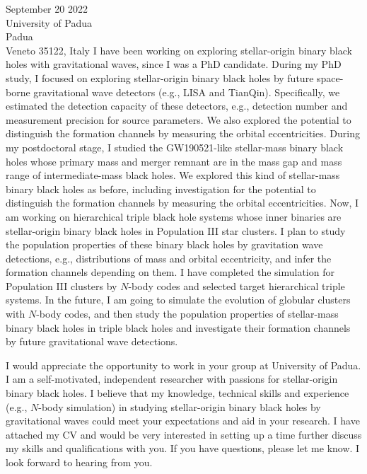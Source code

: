 \documentclass[11pt,a4paper,sans]{letter} %
\begin{document}
\begin{letter}{September 20 2022 \\
University of Padua\\
Padua\\ 
Veneto 35122, Italy}
I have been working on exploring stellar-origin binary black holes with gravitational waves, since I was a PhD
    candidate. During my PhD study, I focused on exploring stellar-origin binary black holes by future
    space-borne gravitational wave detectors (e.g., LISA and TianQin). Specifically, we estimated the detection capacity of
    these detectors, e.g., detection number and measurement precision for source parameters. We also explored the
    potential to distinguish the formation channels by measuring the orbital eccentricities. During my postdoctoral
    stage, I studied the GW190521-like stellar-mass binary black holes whose primary mass and merger remnant are in the
    mass gap and mass range of 
    intermediate-mass black holes. We explored this kind of stellar-mass binary black holes as before, including
    investigation for the potential to distinguish the formation channels by measuring the orbital eccentricities. 
    Now, I am working on
    hierarchical triple
    black hole systems whose inner binaries are stellar-origin binary black holes in Population III star clusters. I plan to
    study the population properties of these binary black holes by gravitation wave detections, e.g., distributions of
    mass and orbital eccentricity, and
    infer the formation channels depending on them. I have completed the simulation for Population III
    clusters by $N$-body codes and selected target hierarchical triple systems.  
    In the future, I am going to simulate the evolution of globular clusters with $N$-body codes, and then study the
    population properties of stellar-mass
    binary black holes in triple black holes and 
    investigate their formation channels by future gravitational wave detections.  

I would appreciate the opportunity to work in your group at University of Padua. I am a self-motivated, independent researcher with
    passions for stellar-origin binary black holes. I believe that my knowledge,
    technical skills and experience (e.g., $N$-body simulation) in studying stellar-origin binary black holes by
    gravitational waves could meet your expectations and aid in your research. I have attached my CV and would be very interested in setting up a time further
discuss my skills and qualifications with you. If you have questions, please let me know. I look forward to
hearing from you. 


\end{letter}
\end{document}
